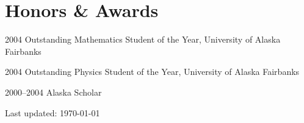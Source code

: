 \documentclass[10pt,letterpaper]{article}
\renewenvironment{itemize}{
  \begin{list}{}{
    \setlength{\leftmargin}{1.5em}
    \setlength{\itemsep}{0.25em}
    \setlength{\parskip}{0pt}
    \setlength{\parsep}{0.25em}
  }
}{
  \end{list}
}
\begin{document}
\section*{Honors \& Awards}
\begin{itemize}
\item 2004 Outstanding Mathematics Student of the Year, University of Alaska Fairbanks
\item 2004 Outstanding Physics Student of the Year, University of Alaska Fairbanks
\item 2000--2004 Alaska Scholar
\end{itemize}

\begin{center}
  \begin{small}
    Last updated: \today
  \end{small}
\end{center}
\end{document}
